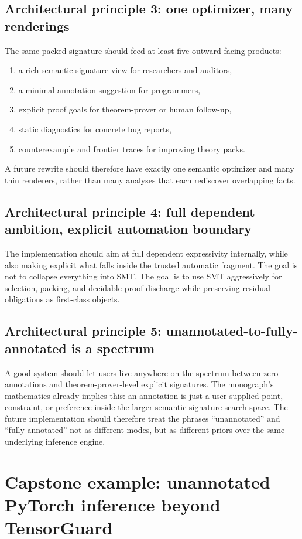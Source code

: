 \documentclass[11pt]{article}
\theoremstyle{definition}
\theoremstyle{plain}
\begin{document}
\subsection{Architectural principle 3: one optimizer, many renderings}
The same packed signature should feed at least five outward-facing products:
\begin{enumerate}[label=\arabic*.]
  \item a rich semantic signature view for researchers and auditors,
  \item a minimal annotation suggestion for programmers,
  \item explicit proof goals for theorem-prover or human follow-up,
  \item static diagnostics for concrete bug reports,
  \item counterexample and frontier traces for improving theory packs.
\end{enumerate}
A future rewrite should therefore have exactly one semantic optimizer and many
thin renderers, rather than many analyses that each rediscover overlapping
facts.

\subsection{Architectural principle 4: full dependent ambition, explicit automation boundary}
The implementation should aim at full dependent expressivity internally, while
also making explicit what falls inside the trusted automatic fragment. The goal
is not to collapse everything into SMT. The goal is to use SMT aggressively for
selection, packing, and decidable proof discharge while preserving residual
obligations as first-class objects.

\subsection{Architectural principle 5: unannotated-to-fully-annotated is a spectrum}
A good system should let users live anywhere on the spectrum between zero
annotations and theorem-prover-level explicit signatures. The monograph's
mathematics already implies this: an annotation is just a user-supplied point,
constraint, or preference inside the larger semantic-signature search space. The
future implementation should therefore treat the phrases ``unannotated'' and
``fully annotated'' not as different modes, but as different priors over the
same underlying inference engine.

\section{Capstone example: unannotated PyTorch inference beyond TensorGuard}
\end{document}
